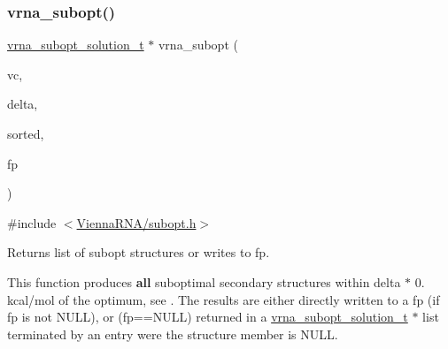 \subsubsection{\texorpdfstring{vrna\+\_\+subopt()}{vrna\_subopt()}}
{\footnotesize\ttfamily \hyperlink{subopt_8h_a01ae9a0f27d245d89f705afd843fc457}{vrna\+\_\+subopt\+\_\+solution\+\_\+t} $\ast$ vrna\+\_\+subopt (\begin{DoxyParamCaption}\item[{\hyperlink{group__fold__compound_ga1b0cef17fd40466cef5968eaeeff6166}{vrna\+\_\+fold\+\_\+compound\+\_\+t} $\ast$}]{vc,  }\item[{int}]{delta,  }\item[{int}]{sorted,  }\item[{F\+I\+LE $\ast$}]{fp }\end{DoxyParamCaption})}



{\ttfamily \#include $<$\hyperlink{subopt_8h}{Vienna\+R\+N\+A/subopt.\+h}$>$}



Returns list of subopt structures or writes to fp. 

This function produces {\bfseries all} suboptimal secondary structures within \textquotesingle{}delta\textquotesingle{} $\ast$ 0. kcal/mol of the optimum, see \cite{wuchty:1999}. The results are either directly written to a \textquotesingle{}fp\textquotesingle{} (if \textquotesingle{}fp\textquotesingle{} is not N\+U\+LL), or (fp==N\+U\+LL) returned in a \hyperlink{subopt_8h_a01ae9a0f27d245d89f705afd843fc457}{vrna\+\_\+subopt\+\_\+solution\+\_\+t} $\ast$ list terminated by an entry were the \textquotesingle{}structure\textquotesingle{} member is N\+U\+LL.

